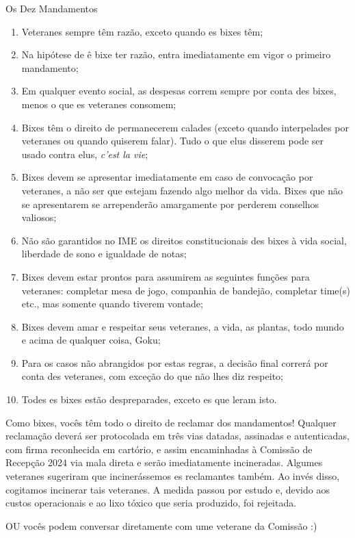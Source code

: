 \begin{editorial}{Os Dez Mandamentos}

\begin{enumerate}
  \item Veteranes sempre têm razão, exceto quando es bixes têm;
  \item Na hipótese de ê bixe ter razão, entra imediatamente em vigor
        o primeiro mandamento;
  \item Em qualquer evento social, as despesas correm sempre por conta des
        bixes, menos o que es veteranes consomem;
  \item Bixes têm o direito de permanecerem calades (exceto quando
        interpelades por veteranes ou quando quiserem falar). Tudo o que elus
        disserem pode ser usado contra elus, \textit{c’est la vie};
  \item Bixes devem se apresentar imediatamente em caso de convocação por
        veteranes, a não ser que estejam fazendo algo melhor da vida. Bixes
        que não se apresentarem se arrependerão amargamente por perderem
        conselhos valiosos; %
  \item Não são garantidos no IME os direitos constitucionais des bixes à vida
        social, liberdade de sono e igualdade de notas;
  \item Bixes devem estar prontos para assumirem as seguintes funções para
        veteranes: completar mesa de jogo, companhia de bandejão, completar
        time(s) etc., mas somente quando tiverem vontade;
  \item Bixes devem amar e respeitar seus veteranes, a vida, as plantas,
        todo mundo e acima de qualquer coisa, Goku;
  \item Para os casos não abrangidos por estas regras, a decisão final correrá
        por conta des veteranes, com exceção do que não lhes diz respeito;
  \item Todes es bixes estão despreparades, exceto es que leram isto.
\end{enumerate}

Como bixes, vocês têm todo o direito de reclamar dos mandamentos! 
Qualquer reclamação deverá ser protocolada em três vias datadas, assinadas e
autenticadas, com firma reconhecida em cartório, e assim encaminhadas à
Comissão de Recepção 2024 %
via mala direta e serão imediatamente incineradas. Algumes veteranes sugeriram
que incinerássemos es reclamantes também. Ao invés disso, cogitamos incinerar
tais veteranes. A medida passou por estudo e, devido aos custos operacionais e
ao lixo tóxico que seria produzido, foi rejeitada.

OU vocês podem conversar diretamente com ume veterane da Comissão :)

\end{editorial}
